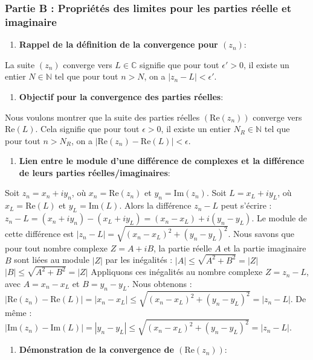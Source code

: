 \documentclass[a4paper,11pt]{report}
\begin{document}
\subsubsection*{Partie B : Propriétés des limites pour les parties réelle et imaginaire}
\begin{enumerate}
\item \textbf{Rappel de la définition de la convergence pour $(z_n)$}:
\end{enumerate}
    La suite $(z_n)$ converge vers $L \in \mathbb{C}$ signifie que pour tout $\epsilon' > 0$, il existe un entier $N \in \mathbb{N}$ tel que pour tout $n > N$, on a $|z_n - L| < \epsilon'$.
\begin{enumerate}
\item \textbf{Objectif pour la convergence des parties réelles}:
\end{enumerate}
    Nous voulons montrer que la suite des parties réelles $(\text{Re}(z_n))$ converge vers $\text{Re}(L)$. Cela signifie que pour tout $\epsilon > 0$, il existe un entier $N_R \in \mathbb{N}$ tel que pour tout $n > N_R$, on a $|\text{Re}(z_n) - \text{Re}(L)| < \epsilon$.
\begin{enumerate}
\item \textbf{Lien entre le module d'une différence de complexes et la différence de leurs parties réelles/imaginaires}:
\end{enumerate}
    Soit $z_n = x_n + i y_n$, où $x_n = \text{Re}(z_n)$ et $y_n = \text{Im}(z_n)$.
    Soit $L = x_L + i y_L$, où $x_L = \text{Re}(L)$ et $y_L = \text{Im}(L)$.
    Alors la différence $z_n - L$ peut s'écrire :
    $z_n - L = (x_n + i y_n) - (x_L + i y_L) = (x_n - x_L) + i (y_n - y_L)$.
    Le module de cette différence est $|z_n - L| = \sqrt{(x_n - x_L)^2 + (y_n - y_L)^2}$.
    Nous savons que pour tout nombre complexe $Z = A+iB$, la partie réelle $A$ et la partie imaginaire $B$ sont liées au module $|Z|$ par les inégalités :
    $|A| \le \sqrt{A^2+B^2} = |Z|$
    $|B| \le \sqrt{A^2+B^2} = |Z|$
    Appliquons ces inégalités au nombre complexe $Z = z_n - L$, avec $A = x_n - x_L$ et $B = y_n - y_L$.
    Nous obtenons :
    $|\text{Re}(z_n) - \text{Re}(L)| = |x_n - x_L| \le \sqrt{(x_n - x_L)^2 + (y_n - y_L)^2} = |z_n - L|$.
    De même :
    $|\text{Im}(z_n) - \text{Im}(L)| = |y_n - y_L| \le \sqrt{(x_n - x_L)^2 + (y_n - y_L)^2} = |z_n - L|$.
\begin{enumerate}
\item \textbf{Démonstration de la convergence de $(\text{Re}(z_n))$}:
\end{enumerate}
\end{document}
